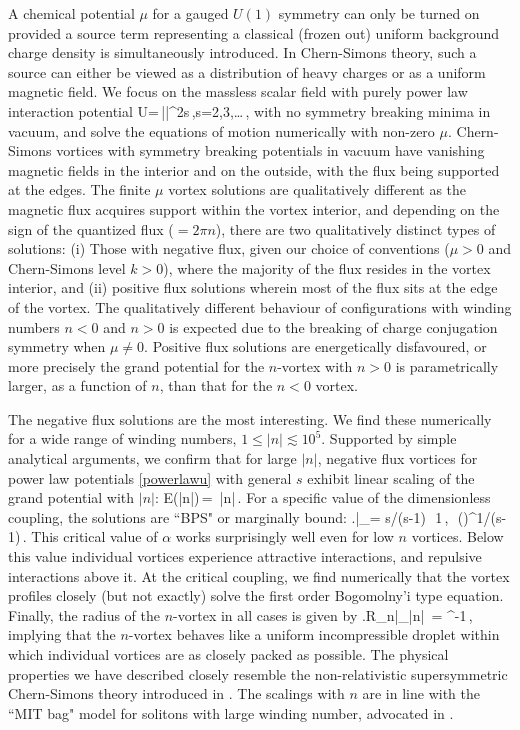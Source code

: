 A chemical potential $\mu$ for a gauged $U(1)$ symmetry  can only be turned on provided a source term representing a classical (frozen out) uniform background charge density is simultaneously introduced. In Chern-Simons theory, such a source can either be viewed as a distribution of heavy charges or as a uniform magnetic field. We focus on the massless scalar field with purely power law interaction potential
\be 
U=\,|\Phi|^{2s}\,,\qquad s=2,3,\ldots\,, \label{powerlawu}
\ee
 with no symmetry breaking minima in vacuum, and solve the equations of motion numerically  with non-zero $\mu$.  Chern-Simons vortices with symmetry breaking potentials in vacuum have vanishing magnetic fields in the interior and on the outside, with the flux being supported at the edges. The finite $\mu$ vortex solutions are qualitatively different as the magnetic flux acquires support within the vortex interior, and depending on the sign of the quantized flux ($=2\pi n$), there are two qualitatively distinct types of solutions: (i) Those with negative flux, given our choice of conventions ($\mu>0$ and Chern-Simons level $k>0$), where the majority of the flux resides in the vortex interior, and (ii) positive flux solutions wherein most of the flux sits at the edge of the vortex. The qualitatively different behaviour of configurations with winding numbers $n<0$ and $n>0$ is expected due to the breaking of charge conjugation symmetry when $\mu\neq 0$.  Positive flux solutions are energetically disfavoured, or more precisely the grand potential for the $n$-vortex with $n>0$ is parametrically larger, as a function of $n$, than that for the $n<0$ vortex. 
 
The negative flux solutions are the most interesting. We find these numerically for a wide range of winding numbers, $1\leq |n| \lesssim 10^5$. Supported by simple analytical arguments, we confirm that for large $|n|$, negative flux vortices for power law potentials \eqref{powerlawu} with general $s$  exhibit linear scaling of the grand potential with $|n|$:
\be
{\cal E}(|n|)\,=\, |n|\,.
\ee
For a specific value of the dimensionless coupling, the solutions are ``BPS" or marginally bound:
\be
\left.\right|_{\alpha = s/(s-1)}\,\to\, 1\,,\qquad \alpha\,\equiv\,
\left(\right)^{1/(s-1)}\,.
\ee
This critical value of $\alpha$ works surprisingly well even for low $n$ vortices. Below this value  individual vortices experience attractive interactions,  and repulsive interactions above it.  At the critical coupling, we find numerically that the vortex profiles closely (but not exactly) solve the first order Bogomolny'i type equation.
Finally, the radius of the $n$-vortex in all cases is given by
\be
\left.R_n\right|_{|n|} \,=\,\,\mu^{-1}\,,
\ee
implying  that the $n$-vortex behaves like a uniform incompressible droplet within which individual vortices are as closely packed as possible. The physical properties we have described  closely resemble the non-relativistic supersymmetric Chern-Simons theory introduced in \cite{Tong:2015xaa}. The scalings with $n$ are in line with the ``MIT bag" model for solitons with large winding number, advocated in \cite{Bolognesi:2005ty, Bolognesi:2005rk, Bolognesi:2007ez}.

